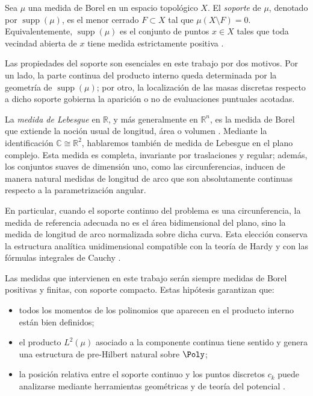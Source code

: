 \begin{defn}
	Sea $\mu$ una medida de Borel en un espacio topológico $X$. El \emph{soporte} de $\mu$, denotado por $\operatorname{supp}(\mu)$, es el menor cerrado $F \subset X$ tal que $\mu(X\setminus F)=0$. Equivalentemente, $\operatorname{supp}(\mu)$ es el conjunto de puntos $x \in X$ tales que toda vecindad abierta de $x$ tiene medida estrictamente positiva \cite{folland1999real,bogachev2007measure}.
\end{defn}

Las propiedades del soporte son esenciales en este trabajo por dos motivos. Por un lado, la parte continua del producto interno queda determinada por la geometría de $\operatorname{supp}(\mu)$; por otro, la localización de las masas discretas respecto a dicho soporte gobierna la aparición o no de evaluaciones puntuales acotadas.

\begin{defn}
	La \emph{medida de Lebesgue} en $\mathbb{R}$, y más generalmente en $\mathbb{R}^n$, es la medida de Borel que extiende la noción usual de longitud, área o volumen \cite{folland1999real,rudin1987real}. Mediante la identificación $\mathbb{C} \cong \mathbb{R}^2$, hablaremos también de medida de Lebesgue en el plano complejo. Esta medida es completa, invariante por traslaciones y regular; además, los conjuntos suaves de dimensión uno, como las circunferencias, inducen de manera natural medidas de longitud de arco que son absolutamente continuas respecto a la parametrización angular.
\end{defn}

En particular, cuando el soporte continuo del problema es una circunferencia, la medida de referencia adecuada no es el área bidimensional del plano, sino la medida de longitud de arco normalizada sobre dicha curva. Esta elección conserva la estructura analítica unidimensional compatible con la teoría de Hardy y con las fórmulas integrales de Cauchy \cite{duren1970theory,szego1975orthogonal}.

\begin{rmk}
	Las medidas que intervienen en este trabajo serán siempre medidas de Borel positivas y finitas, con soporte compacto. Estas hipótesis garantizan que:
	\begin{itemize}
		\item todos los momentos de los polinomios que aparecen en el producto interno están bien definidos;
		\item el producto $L^2(\mu)$ asociado a la componente continua tiene sentido y genera una estructura de pre-Hilbert natural sobre $\Poly$;
		\item la posición relativa entre el soporte continuo y los puntos discretos $c_k$ puede analizarse mediante herramientas geométricas y de teoría del potencial \cite{stahl1992general,szego1975orthogonal}.
	\end{itemize}
\end{rmk}

